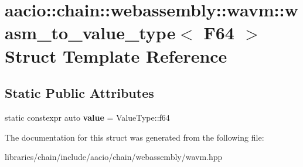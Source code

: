 \hypertarget{structaacio_1_1chain_1_1webassembly_1_1wavm_1_1wasm__to__value__type_3_01_f64_01_4}{}\section{aacio\+:\+:chain\+:\+:webassembly\+:\+:wavm\+:\+:wasm\+\_\+to\+\_\+value\+\_\+type$<$ F64 $>$ Struct Template Reference}
\label{structaacio_1_1chain_1_1webassembly_1_1wavm_1_1wasm__to__value__type_3_01_f64_01_4}
\subsection*{Static Public Attributes}
\begin{DoxyCompactItemize}
\item 
\mbox{\label{structaacio_1_1chain_1_1webassembly_1_1wavm_1_1wasm__to__value__type_3_01_f64_01_4_a575688610b33e921a134e5b25ed6fe32}} 
static constexpr auto {\bfseries value} = Value\+Type\+::f64
\end{DoxyCompactItemize}


The documentation for this struct was generated from the following file\+:\begin{DoxyCompactItemize}
\item 
libraries/chain/include/aacio/chain/webassembly/wavm.\+hpp\end{DoxyCompactItemize}
